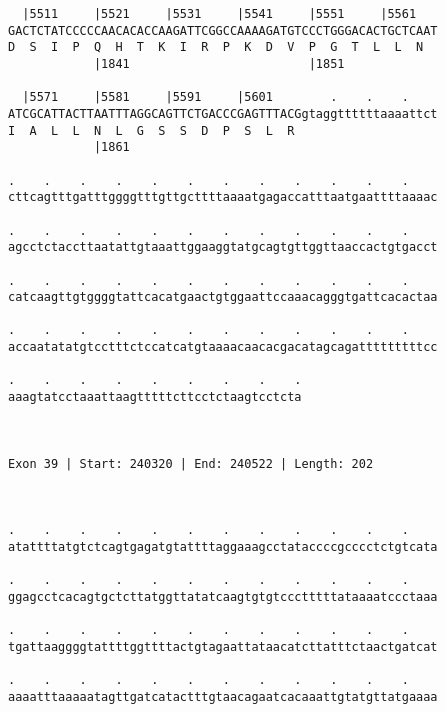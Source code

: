 \documentclass{article}
\begin{document}
\begin{Verbatim}
  |5511     |5521     |5531     |5541     |5551     |5561   
GACTCTATCCCCCAACACACCAAGATTCGGCCAAAAGATGTCCCTGGGACACTGCTCAAT
D  S  I  P  Q  H  T  K  I  R  P  K  D  V  P  G  T  L  L  N  
            |1841                         |1851             
  
  |5571     |5581     |5591     |5601        .    .    .    
ATCGCATTACTTAATTTAGGCAGTTCTGACCCGAGTTTACGgtaggttttttaaaattct
I  A  L  L  N  L  G  S  S  D  P  S  L  R                    
            |1861                                           
  
.    .    .    .    .    .    .    .    .    .    .    .    
cttcagtttgatttggggtttgttgcttttaaaatgagaccatttaatgaattttaaaac
                                                            
.    .    .    .    .    .    .    .    .    .    .    .    
agcctctaccttaatattgtaaattggaaggtatgcagtgttggttaaccactgtgacct
                                                            
.    .    .    .    .    .    .    .    .    .    .    .    
catcaagttgtggggtattcacatgaactgtggaattccaaacagggtgattcacactaa
                                                            
.    .    .    .    .    .    .    .    .    .    .    .    
accaatatatgtcctttctccatcatgtaaaacaacacgacatagcagatttttttttcc
                                                            
.    .    .    .    .    .    .    .    .
aaagtatcctaaattaagtttttcttcctctaagtcctcta
                                         
                                         
 
Exon 39 | Start: 240320 | End: 240522 | Length: 202



.    .    .    .    .    .    .    .    .    .    .    .    
atattttatgtctcagtgagatgtattttaggaaagcctataccccgcccctctgtcata
                                                            
.    .    .    .    .    .    .    .    .    .    .    .    
ggagcctcacagtgctcttatggttatatcaagtgtgtccctttttataaaatccctaaa
                                                            
.    .    .    .    .    .    .    .    .    .    .    .    
tgattaaggggtattttggttttactgtagaattataacatcttatttctaactgatcat
                                                            
.    .    .    .    .    .    .    .    .    .    .    .    
aaaatttaaaaatagttgatcatactttgtaacagaatcacaaattgtatgttatgaaaa
                                                            

\end{Verbatim}
\end{document}
